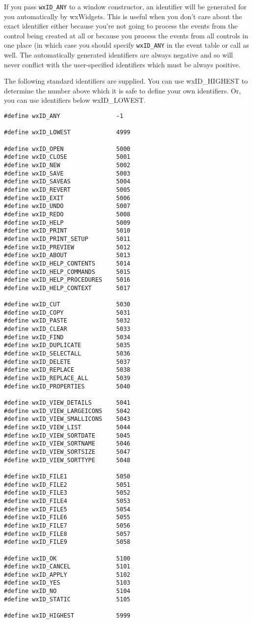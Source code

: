 If you pass {\tt wxID\_ANY} to a window constructor, an identifier will be
generated for you automatically by wxWidgets. This is useful when you don't
care about the exact identifier either because you're not going to process the
events from the control being created at all or because you process the events
from all controls in one place (in which case you should specify {\tt wxID\_ANY} 
in the event table or  call
as well. The automatically generated identifiers are always negative and so
will never conflict with the user-specified identifiers which must be always
positive.

The following standard identifiers are supplied. You can use wxID\_HIGHEST to
determine the number above which it is safe to define your own identifiers. Or,
you can use identifiers below wxID\_LOWEST.

\begin{verbatim}
#define wxID_ANY                -1

#define wxID_LOWEST             4999

#define wxID_OPEN               5000
#define wxID_CLOSE              5001
#define wxID_NEW                5002
#define wxID_SAVE               5003
#define wxID_SAVEAS             5004
#define wxID_REVERT             5005
#define wxID_EXIT               5006
#define wxID_UNDO               5007
#define wxID_REDO               5008
#define wxID_HELP               5009
#define wxID_PRINT              5010
#define wxID_PRINT_SETUP        5011
#define wxID_PREVIEW            5012
#define wxID_ABOUT              5013
#define wxID_HELP_CONTENTS      5014
#define wxID_HELP_COMMANDS      5015
#define wxID_HELP_PROCEDURES    5016
#define wxID_HELP_CONTEXT       5017

#define wxID_CUT                5030
#define wxID_COPY               5031
#define wxID_PASTE              5032
#define wxID_CLEAR              5033
#define wxID_FIND               5034
#define wxID_DUPLICATE          5035
#define wxID_SELECTALL          5036
#define wxID_DELETE             5037
#define wxID_REPLACE            5038
#define wxID_REPLACE_ALL        5039
#define wxID_PROPERTIES         5040

#define wxID_VIEW_DETAILS       5041
#define wxID_VIEW_LARGEICONS    5042
#define wxID_VIEW_SMALLICONS    5043
#define wxID_VIEW_LIST          5044
#define wxID_VIEW_SORTDATE      5045
#define wxID_VIEW_SORTNAME      5046
#define wxID_VIEW_SORTSIZE      5047
#define wxID_VIEW_SORTTYPE      5048

#define wxID_FILE1              5050
#define wxID_FILE2              5051
#define wxID_FILE3              5052
#define wxID_FILE4              5053
#define wxID_FILE5              5054
#define wxID_FILE6              5055
#define wxID_FILE7              5056
#define wxID_FILE8              5057
#define wxID_FILE9              5058

#define wxID_OK                 5100
#define wxID_CANCEL             5101
#define wxID_APPLY              5102
#define wxID_YES                5103
#define wxID_NO                 5104
#define wxID_STATIC             5105

#define wxID_HIGHEST            5999
\end{verbatim}

